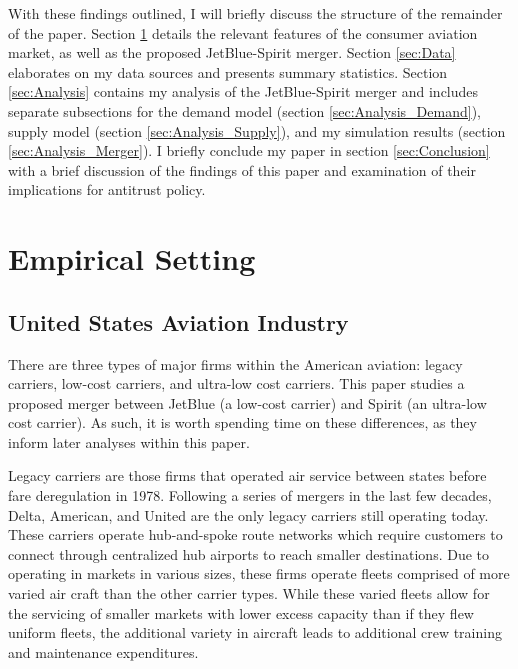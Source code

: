 \documentclass{article}
\begin{document}
    With these findings outlined, I will briefly discuss the structure of the remainder of the paper. Section \ref{sec:Setting} details the relevant features of the consumer aviation market, as well as the proposed JetBlue-Spirit merger. Section \ref{sec:Data} elaborates on my data sources and presents summary statistics. Section \ref{sec:Analysis} contains my analysis of the JetBlue-Spirit merger and includes separate subsections for the demand model (section \ref{sec:Analysis_Demand}), supply model (section \ref{sec:Analysis_Supply}), and my simulation results (section \ref{sec:Analysis_Merger}).  I briefly conclude my paper in section \ref{sec:Conclusion} with a brief discussion of the findings of this paper and examination of their implications for antitrust policy. 

  
	
	\section{Empirical Setting}
	\label{sec:Setting}
	
	\subsection{United States Aviation Industry}
	\label{sec:Setting_Aviation}
	There are three types of major firms within the American aviation: legacy carriers, low-cost carriers, and ultra-low cost carriers. This paper studies a proposed merger between JetBlue (a low-cost carrier) and Spirit (an ultra-low cost carrier). As such, it is worth spending time on these differences, as they inform later analyses within this paper. 	
    
	Legacy carriers are those firms that operated air service between states before fare deregulation in 1978. Following a series of mergers in the last few decades, Delta, American, and United are the only legacy carriers still operating today. These carriers operate hub-and-spoke route networks which require customers to connect through centralized hub airports to reach smaller destinations. Due to operating in markets in various sizes, these firms operate fleets comprised of more varied air craft than the other carrier types. While these varied fleets allow for the servicing of smaller markets with lower excess capacity than if they flew uniform fleets, the additional variety in aircraft leads to additional crew training and maintenance expenditures.   
	
\end{document}
